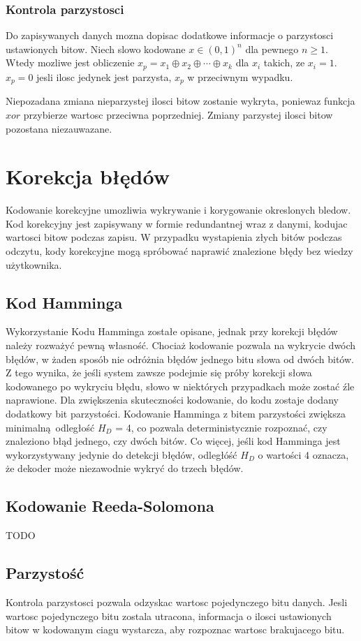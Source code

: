 \subsubsection{Kontrola parzystosci}
Do zapisywanych danych mozna dopisac dodatkowe informacje o parzystosci ustawionych bitow. Niech slowo kodowane $x \in (0,1)^n$ dla pewnego $n \ge 1$. Wtedy mozliwe jest obliczenie $x_p = x_1 \oplus x_2 \oplus \cdots \oplus x_k$ dla $x_i$ takich, ze $x_i = 1$. $x_p = 0$ jesli ilosc jedynek jest parzysta, $x_p$ w przeciwnym wypadku. 

Niepozadana zmiana nieparzystej ilosci bitow zostanie wykryta, poniewaz funkcja $xor$ przybierze wartosc przeciwna poprzedniej. Zmiany parzystej ilosci bitow pozostana niezauwazane.

\section {Korekcja błędów}
Kodowanie korekcyjne umozliwia wykrywanie i korygowanie okreslonych bledow. Kod korekcyjny jest zapisywany w formie redundantnej wraz z danymi, kodujac wartosci bitow podczas zapisu. W przypadku wystapienia złych bitów podczas odczytu, kody korekcyjne mogą spróbować naprawić znalezione błędy bez wiedzy użytkownika.
\subsection{Kod Hamminga}
Wykorzystanie Kodu Hamminga zostałe opisane, jednak przy korekcji błędów należy rozważyć pewną własność. Chociaż kodowanie pozwala na wykrycie dwóch błędów, w żaden sposób nie odróżnia błędów jednego bitu słowa od dwóch bitów. Z tego wynika, że jeśli system zawsze podejmie się próby korekcji słowa kodowanego po wykryciu błędu, słowo w niektórych przypadkach może zostać źle naprawione.
Dla zwiększenia skuteczności kodowanie, do kodu zostaje dodany dodatkowy bit parzystości. Kodowanie Hamminga z bitem parzystości zwiększa minimalną odległość $H_D$ = 4, co pozwala deterministycznie rozpoznać, czy znaleziono błąd jednego, czy dwóch bitów. Co więcej, jeśli kod Hamminga jest wykorzystywany jedynie do detekcji błędów, odległóść $H_D$ o wartości 4 oznacza, że dekoder może niezawodnie wykryć do trzech błędów.  
\subsection{Kodowanie Reeda-Solomona}
TODO
\subsection{Parzystość}
Kontrola parzystosci pozwala odzyskac wartosc pojedynczego bitu danych. Jesli wartosc pojedynczego bitu zostala utracona, informacja o ilosci ustawionych bitow w kodowanym ciagu wystarcza, aby rozpoznac wartosc brakujacego bitu.  
